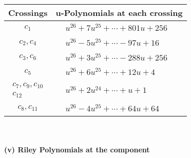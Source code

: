 \documentclass[1p]{elsarticle_modified}
\theoremstyle{definition}
\begin{document}
\begin{tabular}{m{50pt}|m{274pt}}
Crossings & \hspace{64pt}u-Polynomials at each crossing \\
\hline $$\begin{aligned}c_{1}\end{aligned}$$&$\begin{aligned}
&u^{26}+7 u^{25}+\cdots+801 u+256
\end{aligned}$\\
\hline $$\begin{aligned}c_{2},c_{4}\end{aligned}$$&$\begin{aligned}
&u^{26}-5 u^{25}+\cdots-97 u+16
\end{aligned}$\\
\hline $$\begin{aligned}c_{3},c_{6}\end{aligned}$$&$\begin{aligned}
&u^{26}+3 u^{25}+\cdots-288 u+256
\end{aligned}$\\
\hline $$\begin{aligned}c_{5}\end{aligned}$$&$\begin{aligned}
&u^{26}+6 u^{25}+\cdots+12 u+4
\end{aligned}$\\
\hline $$\begin{aligned}c_{7},c_{9},c_{10}\\c_{12}\end{aligned}$$&$\begin{aligned}
&u^{26}+2 u^{24}+\cdots+u+1
\end{aligned}$\\
\hline $$\begin{aligned}c_{8},c_{11}\end{aligned}$$&$\begin{aligned}
&u^{26}-4 u^{25}+\cdots+64 u+64
\end{aligned}$\\
\hline
\end{tabular}\\~\\
\newpage\renewcommand{\arraystretch}{1}
\flushleft \textbf{(v) Riley Polynomials at the component}\newline \\
\end{document}
